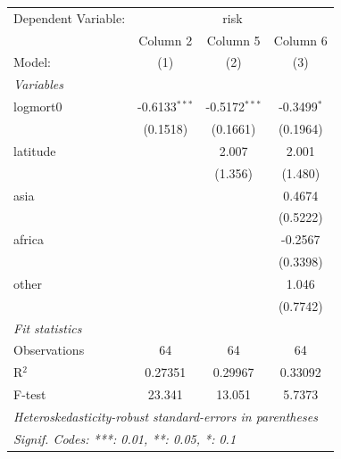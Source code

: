 
\begingroup
\centering
\begin{tabular}{lccc}
   \tabularnewline \midrule \midrule
   Dependent Variable: & \multicolumn{3}{c}{risk}\\
                & Column 2        & Column 5        & Column 6 \\   
   Model:       & (1)             & (2)             & (3)\\  
   \midrule
   \emph{Variables}\\
   logmort0     & -0.6133$^{***}$ & -0.5172$^{***}$ & -0.3499$^{*}$\\   
                & (0.1518)        & (0.1661)        & (0.1964)\\   
   latitude     &                 & 2.007           & 2.001\\   
                &                 & (1.356)         & (1.480)\\   
   asia         &                 &                 & 0.4674\\   
                &                 &                 & (0.5222)\\   
   africa       &                 &                 & -0.2567\\   
                &                 &                 & (0.3398)\\   
   other        &                 &                 & 1.046\\   
                &                 &                 & (0.7742)\\   
   \midrule
   \emph{Fit statistics}\\
   Observations & 64              & 64              & 64\\  
   R$^2$        & 0.27351         & 0.29967         & 0.33092\\  
   F-test       & 23.341          & 13.051          & 5.7373\\  
   \midrule \midrule
   \multicolumn{4}{l}{\emph{Heteroskedasticity-robust standard-errors in parentheses}}\\
   \multicolumn{4}{l}{\emph{Signif. Codes: ***: 0.01, **: 0.05, *: 0.1}}\\
\end{tabular}
\par\endgroup


